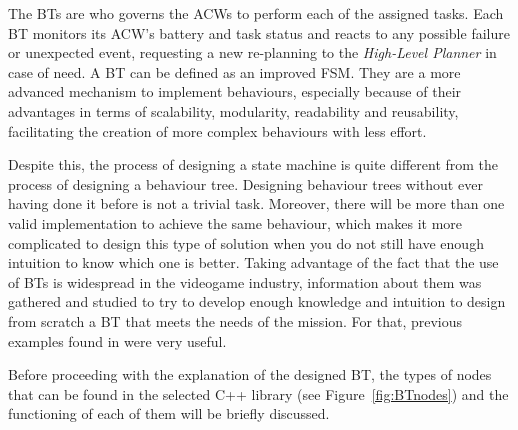 \documentclass[fontsize=11pt, English=false, Español=true, Myfinal=true, twoside, numbers=noenddot]{scrbook}
\begin{document}
{%
The \glspl{BT} are who governs the \glspl{ACW} to perform each of the assigned tasks. Each \gls{BT} monitors its \gls{ACW}'s battery and task status and reacts to any possible failure or unexpected event, requesting a new re-planning to the \emph{High-Level Planner} in case of need. A \gls{BT} can be defined as an improved \gls{FSM}. They are a more advanced mechanism to implement behaviours, especially because of their advantages in terms of scalability, modularity, readability and reusability, facilitating the creation of more complex behaviours with less effort.

Despite this, the process of designing a state machine is quite different from the process of designing a behaviour tree. Designing behaviour trees without ever having done it before is not a trivial task. Moreover, there will be more than one valid implementation to achieve the same behaviour, which makes it more complicated to design this type of solution when you do not still have enough intuition to know which one is better. Taking advantage of the fact that the use of \glspl{BT} is widespread in the videogame industry, information about them was gathered and studied to try to develop enough knowledge and intuition to design from scratch a \gls{BT} that meets the needs of the mission. For that, previous examples found in \cite{BT-CPP-doc, colledanchise2018behavior, BT-AI} were very useful.

Before proceeding with the explanation of the designed \gls{BT}, the types of nodes that can be found in the selected C++ library (see Figure~\ref{fig:BTnodes}) and the functioning of each of them will be briefly discussed.

}
\end{document}
